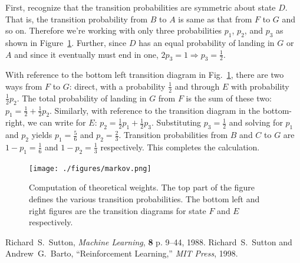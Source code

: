\documentclass[conference]{IEEEtran}
\begin{document}
First, recognize that the transition probabilities are symmetric about state $D$. That is, the transition probability from $B$ to $A$ is same as that from $F$ to $G$ and so on. Therefore we're working with only three probabilities $p_1$, $p_2$, and $p_3$ as shown in Figure~\ref{fig:markov}. Further, since $D$ has an equal probability of landing in $G$ or $A$ and since it eventually must end in one, $2p_3 = 1\Rightarrow p_3=\frac{1}{2}$.

With reference to the bottom left transition diagram in Fig.~\ref{fig:markov}, there are two ways from $F$ to $G$: direct, with a probability $\frac{1}{2}$ and through $E$ with probability $\frac{1}{2}p_2$. The total probability of landing in $G$ from $F$ is the sum of these two: $p_1 = \frac{1}{2} + \frac{1}{2}p_2$. Similarly, with reference to the transition diagram in the bottom-right, we can write for $E$: $p_2 = \frac{1}{2}p_1 + \frac{1}{2}p_3$. Substituting $p_3=\frac{1}{2}$ and solving for $p_1$ and $p_2$ yields $p_1=\frac{5}{6}$ and $p_2=\frac{2}{3}$. Transition probabilities from $B$ and $C$ to $G$ are $1-p_1 = \frac{1}{6}$ and $1-p_2 = \frac{1}{3}$ respectively. This completes the calculation.
\begin{figure}[!bt]
\centering
\texttt{[image: ./figures/markov.png]}
\caption{Computation of theoretical weights. The top part of the figure defines the various transition probabilities. The bottom left and right figures are the transition diagrams for state $F$ and $E$ respectively.\label{fig:markov}}
\end{figure}
\begin{thebibliography}{1}
Richard~S.~Sutton, {\em Machine Learning}, {\bf 8} p. 9--44, 1988.
Richard~S.~Sutton and Andrew~G.~Barto, ``Reinforcement Learning,'' {\em MIT Press}, 1998.
\end{thebibliography}
\end{document}
